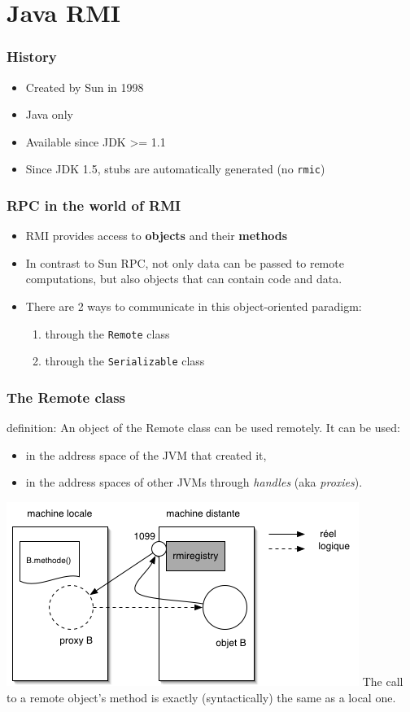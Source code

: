 \documentclass[bigger,hyperref={colorlinks=true, urlcolor=red, plainpages=false, pdfpagelabels, bookmarksnumbered}]{beamer}
\begin{document}
\section{Java RMI}
\label{sec-3}
\begin{frame}
\frametitle{History}
\label{sec-3-1}

\begin{itemize}
\item Created by Sun in 1998
\item Java only
\item Available since JDK >= 1.1
\item Since JDK 1.5, stubs are automatically generated (no \texttt{rmic})
\end{itemize}
\end{frame}
\begin{frame}
\frametitle{RPC in the world of RMI}
\label{sec-3-2}

\begin{itemize}
\item RMI provides access to \textbf{objects} and their \textbf{methods}
\item In contrast to Sun RPC, not only data can be passed
     to remote computations, but also objects that can contain
     code and data.\\[5mm]
\item There are 2 ways to communicate in this object-oriented
     paradigm:
\begin{enumerate}
\item through the \texttt{Remote} class
\item through the \texttt{Serializable} class
\end{enumerate}
\end{itemize}
\end{frame}
\begin{frame}
\frametitle{The Remote class}
\label{sec-3-3}

   
   definition: An object of the Remote class can be used remotely.
   It can be used:
\begin{itemize}
\item in the address space of the JVM that created it,
\item in the address spaces of other JVMs through \emph{handles} (aka \emph{proxies}).
\end{itemize}
   
\includegraphics[width=.9\linewidth]{../img/proxy.png}
The call to a remote object's method is exactly (syntactically) the same as a local one.   
\end{frame}
\end{document}
